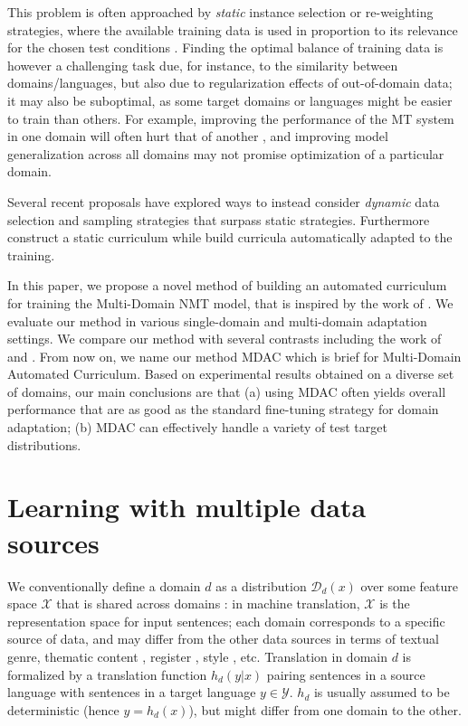 \documentclass[11pt]{article}
\begin{document}
This problem is often approached by \emph{static} instance selection or re-weighting strategies, where the available training data is used in proportion to its relevance for the chosen test conditions \citep{Moore10selection,Axelrod11domain}. Finding the optimal balance of training data is however a challenging task due, for instance, to the similarity between domains/languages, but also due to regularization effects of out-of-domain data; it may also be suboptimal, as some target domains or languages might be easier to train than others. For example, improving the performance of the MT system in one domain will often hurt that of another \citep{Vanderwees17dynamic, Britz17mixing}, and improving model generalization across all domains \citep{koehn18findings} may not promise optimization of a particular domain. 

Several recent proposals \citep{platanios19competence,Zhang19curriculum,Kumar19reinforcement,Wang20learning-multi,Graves17automated,Wang20balancing,Wang20learning-multi,Vanderwees17dynamic} have explored ways to instead consider \emph{dynamic} data selection and sampling strategies that surpass static strategies. Furthermore \citet{Zhang19curriculum,Vanderwees17dynamic} construct a static curriculum while \citet{platanios19competence,Kumar19reinforcement,Graves17automated,Wang20balancing,Wang20learning-multi} build curricula automatically adapted to the training.

In this paper, we propose a novel method of building an automated curriculum for training the Multi-Domain NMT model, that is inspired by the work of \citet{Graves17automated}. We evaluate our method in various single-domain and multi-domain adaptation settings. We compare our method with several contrasts including the work of \citet{Zhang19curriculum} and \citet{Wang20balancing}. From now on, we name our method MDAC which is brief for Multi-Domain Automated Curriculum. Based on experimental results obtained on a diverse set of domains, our main conclusions are that (a) using MDAC often yields overall performance that are as good as the standard fine-tuning strategy for domain adaptation; (b) MDAC can effectively handle a variety of test target distributions.

\section{Learning with multiple data sources} \label{sec:mdmt}

We conventionally define a domain $d$ as a distribution $\mathcal{D}_d(x)$ over some feature space $\mathcal{X}$ that is shared across domains \citep{Pan10asurvey}: in machine translation, $\mathcal{X}$ is the representation space for input sentences; each domain corresponds to a specific source of data, and may differ from the other data sources in terms of textual genre, thematic content \cite{Chen16guided,Zhang16topicinformed}, register \cite{Sennrich16politeness}, style \cite{Niu18multitask}, etc. Translation in domain $d$ is formalized by a translation function $h_d(y|x)$ pairing sentences in a source language with sentences in a target language $y \in \mathcal{Y}$. $h_d$ is usually assumed to be deterministic (hence $y = h_d(x)$), but might differ from one domain to the other.
\end{document}
